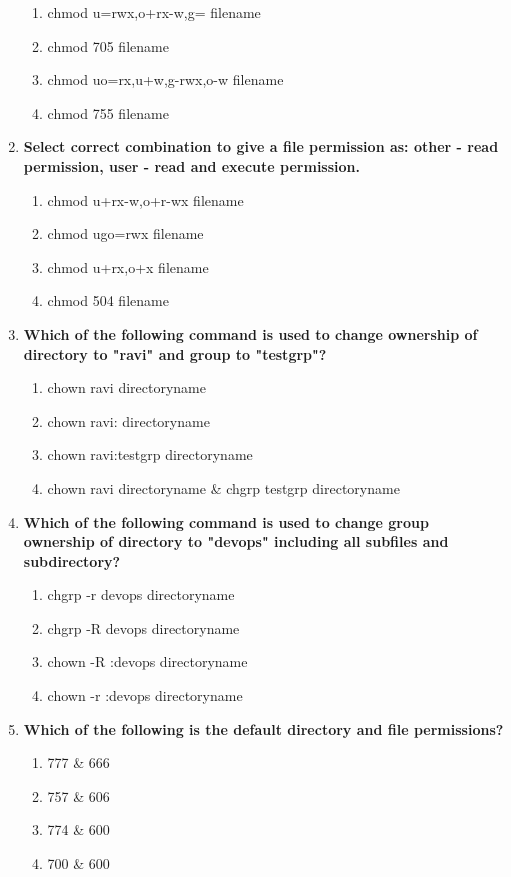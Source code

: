 \begin{flushleft}
\begin{enumerate}
		\begin{enumerate}[label=(\alph*)]
			\item chmod u=rwx,o+rx-w,g=  filename  %
			\item chmod 705 filename  %
			\item chmod uo=rx,u+w,g-rwx,o-w filename   %
			\item chmod 755 filename
		\end{enumerate}
		\bigskip
		\bigskip
		\item \textbf{Select correct combination to give a file permission as: other - read permission, user - read and execute permission.}
		\begin{enumerate}[label=(\alph*)]
			\item chmod u+rx-w,o+r-wx  filename     %
			\item chmod ugo=rwx  filename 
			\item chmod u+rx,o+x  filename
			\item chmod 504 filename
		\end{enumerate}
		\bigskip
		\bigskip
		\item \textbf{Which of the following command is used to change ownership of directory to "ravi" and group to "testgrp"?}
		\begin{enumerate}[label=(\alph*)]
			\item chown ravi directoryname
			\item chown ravi: directoryname
			\item chown ravi:testgrp directoryname  %
			\item chown ravi directoryname \& chgrp testgrp directoryname %
		\end{enumerate}
		\bigskip
		\bigskip
		\item \textbf{Which of the following command is used to change group ownership of directory to "devops" including all subfiles and subdirectory?}
		\begin{enumerate}[label=(\alph*)]
			\item chgrp -r devops directoryname  
			\item chgrp -R devops directoryname  %
			\item chown -R :devops directoryname  %
			\item chown -r :devops directoryname
		\end{enumerate}
		\bigskip
		\bigskip
		\item \textbf{Which of the following is the default directory and file permissions?}
		\begin{enumerate}[label=(\alph*)]
			\item 777  \&  666   %
			\item 757  \&  606
			\item 774  \&  600
			\item 700  \&  600
		\end{enumerate}
	\end{enumerate}
	
	
\end{flushleft}
\newpage


